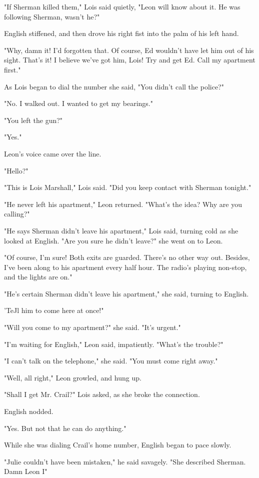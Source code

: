 \documentclass{novel}
\begin{document}
"If Sherman killed them," Lois said quietly, "Leon will know about it. He was following Sherman, wasn't he?"

English stiffened, and then drove his right fist into the palm of his left hand.

"Why, damn it! I'd forgotten that. Of course, Ed wouldn't have let him out of his sight. That's it! I believe we've got him, Lois! Try and get Ed. Call my apartment first."

As Lois began to dial the number she said, "You didn't call the police?"

"No. I walked out. I wanted to get my bearings."

"You left the gun?"

"Yes."

Leon's voice came over the line.

"Hello?"

"This is Lois Marshall," Lois said. "Did you keep contact with Sherman tonight."

"He never left his apartment," Leon returned. "What's the idea? Why are you calling?"

"He says Sherman didn't leave his apartment," Lois said, turning cold as she looked at English. "Are you sure he didn't leave?" she went on to Leon.

"Of course, I'm sure! Both exits are guarded. There's no other way out. Besides, I've been along to his apartment every half hour. The radio's playing non-stop, and the lights are on."

"He's certain Sherman didn't leave his apartment," she said, turning to English.

'TeJl him to come here at once!"

"Will you come to my apartment?" she said. "It's urgent."

"I'm waiting for English," Leon said, impatiently. "What's the trouble?"

"I can't talk on the telephone," she said. "You must come right away."

"Well, all right," Leon growled, and hung up.

"Shall I get Mr. Crail?" Lois asked, as she broke the connection.

English nodded.

"Yes. But not that he can do anything."

While she was dialing Crail's home number, English began to pace slowly.

"Julie couldn't have been mistaken," he said savagely. "She described Sherman. Damn Leon I"
\end{document}
